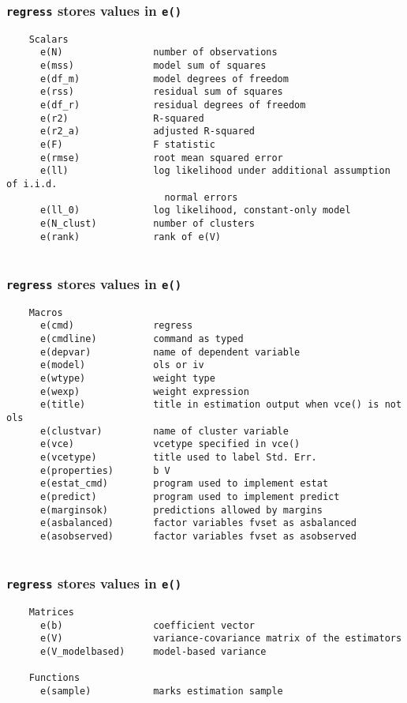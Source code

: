 \begin{frame}[fragile]
	\frametitle{\texttt{regress} stores values in \texttt{e()}}
	\scriptsize
	\begin{verbatim}
	Scalars        
	  e(N)                number of observations
	  e(mss)              model sum of squares
	  e(df_m)             model degrees of freedom
	  e(rss)              residual sum of squares
	  e(df_r)             residual degrees of freedom
	  e(r2)               R-squared
	  e(r2_a)             adjusted R-squared
	  e(F)                F statistic
	  e(rmse)             root mean squared error
	  e(ll)               log likelihood under additional assumption of i.i.d.
	                        normal errors
	  e(ll_0)             log likelihood, constant-only model
	  e(N_clust)          number of clusters
	  e(rank)             rank of e(V)
	  
	\end{verbatim}
\end{frame}

\begin{frame}[fragile]
	\frametitle{\texttt{regress} stores values in \texttt{e()}}
	\scriptsize
	\begin{verbatim}
	Macros         
	  e(cmd)              regress
	  e(cmdline)          command as typed
	  e(depvar)           name of dependent variable
	  e(model)            ols or iv
	  e(wtype)            weight type
	  e(wexp)             weight expression
	  e(title)            title in estimation output when vce() is not ols
	  e(clustvar)         name of cluster variable
	  e(vce)              vcetype specified in vce()
	  e(vcetype)          title used to label Std. Err.
	  e(properties)       b V
	  e(estat_cmd)        program used to implement estat
	  e(predict)          program used to implement predict
	  e(marginsok)        predictions allowed by margins
	  e(asbalanced)       factor variables fvset as asbalanced
	  e(asobserved)       factor variables fvset as asobserved
	  
	\end{verbatim}
\end{frame}


\begin{frame}[fragile]
	\frametitle{\texttt{regress} stores values in \texttt{e()}}
	\scriptsize
	\begin{verbatim}
	Matrices       
	  e(b)                coefficient vector
	  e(V)                variance-covariance matrix of the estimators
	  e(V_modelbased)     model-based variance
	
	Functions      
	  e(sample)           marks estimation sample
	  
	\end{verbatim}
\end{frame}

